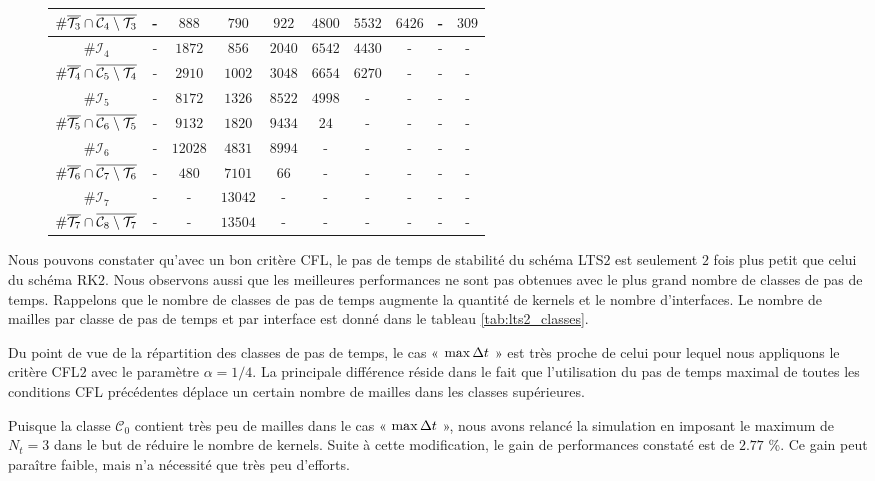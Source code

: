\begin{figure}[!h]
{{\begin{tabular}{|c|c|c|c|c|c|c|c|c|c|}
		$\#\overline{\mathcal{T}_3} \cap \overline{\mathcal{C}_4\setminus\mathcal{T}_3}$
		& - & $888$ & $790$ & $922$ & $4800$ & $5532$ & $6426$ & - & $309$ \\	\hline
		$\#\mathcal{I}_4$
		& - & $1872$ & $856$ & $2040$ & $6542$ & $4430$ & - & - & - \\	\hline
		$\#\overline{\mathcal{T}_4} \cap \overline{\mathcal{C}_5\setminus\mathcal{T}_4}$
		& - & $2910$ & $1002$ & $3048$ & $6654$ & $6270$ & - & - & - \\	\hline
		$\#\mathcal{I}_5$
		& - & $8172$ & $1326$ & $8522$ & $4998$ & - & - & - & - \\	\hline
		$\#\overline{\mathcal{T}_5} \cap \overline{\mathcal{C}_6\setminus\mathcal{T}_5}$
		& - & $9132$ & $1820$ & $9434$ & $24$ & - & - & - & - \\	\hline
		$\#\mathcal{I}_6$
		& - & $12028$ & $4831$ & $8994$ & - & - & - & - & - \\	\hline
		$\#\overline{\mathcal{T}_6} \cap \overline{\mathcal{C}_7\setminus\mathcal{T}_6}$
		& - & $480$ & $7101$ & $66$ & - & - & - & - & - \\	\hline
		$\#\mathcal{I}_7$
		& - & - & $13042$ & - & - & - & - & - & - \\	\hline
		$\#\overline{\mathcal{T}_7} \cap \overline{\mathcal{C}_8\setminus\mathcal{T}_7}$
		& - & - & $13504$ & - & - & - & - & - & - \\	\hline
	\end{tabular}}
	}
\end{figure}


Nous pouvons constater qu'avec un bon critère CFL, le pas de temps de
stabilité du schéma LTS$2$ est seulement $2$ fois plus petit
que celui du schéma RK$2$.
Nous observons aussi que les meilleures performances ne sont pas obtenues
avec le plus grand nombre de classes de pas de temps. Rappelons que
le nombre de classes de pas de temps augmente la quantité de kernels
et le nombre d'interfaces.
Le nombre de mailles par classe de pas de temps et par interface est donné dans le
tableau \ref{tab:lts2_classes}.

Du point de vue de la répartition des classes de pas de temps, le cas « $\max\Delta t$ »
est très proche de celui pour lequel nous appliquons le critère CFL$2$ avec le
paramètre $\alpha=1/4$. La principale différence réside dans le fait que
l'utilisation du pas de temps maximal de toutes les conditions CFL précédentes
déplace un certain nombre de mailles dans les classes supérieures.

Puisque la classe $\mathcal{C}_0$ contient très peu de mailles dans le cas « $\max\Delta t$ »,
nous avons relancé la simulation en imposant le maximum de $N_t=3$ dans le
but de réduire le nombre de kernels.
Suite à cette modification, le gain de performances constaté est de $2.77$ \%.
Ce gain peut paraître faible, mais n'a nécessité que très peu d'efforts.
\\




